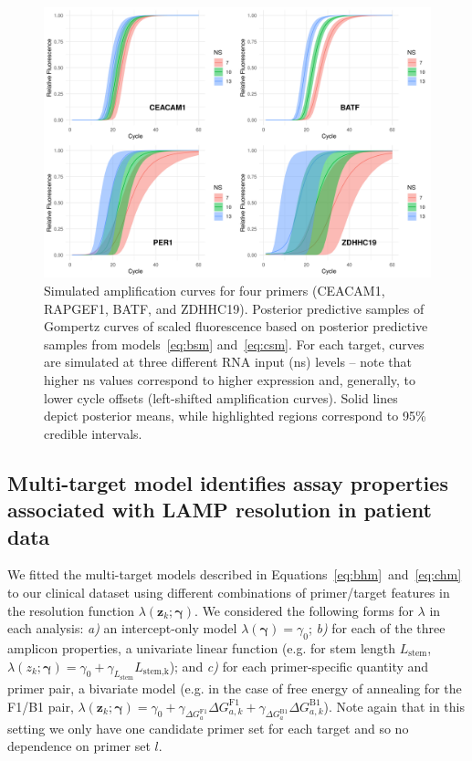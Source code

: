 \documentclass[../thesis.tex]{subfiles}
\begin{document}
\begin{figure}[!tpb] 
\centering
\includegraphics[width=5in]{../figures/chapter2/paper_sm_comp_plot.png}
\caption{Simulated amplification curves for four primers ({CEACAM1}, {RAPGEF1}, {BATF}, and {ZDHHC19}). Posterior predictive samples of Gompertz curves of scaled fluorescence based on posterior predictive samples from models~\ref{eq:bsm} and~\ref{eq:csm}. For each target, curves are simulated at three different RNA input (\gls{ns}) levels -- note that higher \gls{ns} values correspond to higher expression and, generally, to lower cycle offsets (left-shifted amplification curves). Solid lines depict posterior means, while highlighted regions correspond to 95\% credible intervals. \label{fig:sm_comp_plot}}
\end{figure}


\subsection{Multi-target model identifies assay properties associated with LAMP resolution in patient data\label{sec:hierarchicalresults}}
We fitted the multi-target models described in Equations~\ref{eq:bhm}~and~\ref{eq:chm} to our clinical dataset using different combinations of primer/target features in the resolution function $\lambda(\bm{z}_{k}; \bm{\gamma})$. We considered the following forms for $\lambda$ in each analysis: \emph{a)} an intercept-only model $\lambda(\bm{\gamma}) = \gamma_0$; \emph{b)} for each of the three amplicon properties, a univariate linear function (e.g. for stem length $L_{\text{stem}}$, $\lambda(z_{k}; \bm{\gamma}) = \gamma_0 + \gamma_{L_{\text{stem}}} L_{\text{stem,k}}$); and \emph{c)} for each primer-specific quantity and primer pair, a bivariate model (e.g. in the case of free energy of annealing for the F1/B1 pair, $\lambda(\bm{z}_{k}; \bm{\gamma}) = \gamma_0 + \gamma_{\Delta G_a^{\text{F1}}} \Delta G_{a,k}^{\text{F1}} + \gamma_{\Delta G_a^{\text{B1}}} \Delta G_{a,k}^{\text{B1}}$). Note again that in this setting we only have one candidate primer set for each target and so no dependence on primer set $l$.
\end{document}
